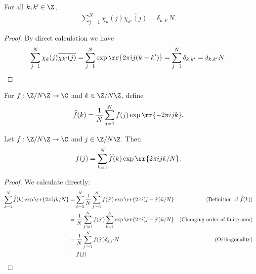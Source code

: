 \documentclass{article}
\begin{document}
\begin{claim*}[5]
  For all $k,k'\in\Z$,
  \begin{align*}
    \sum_{j=1}^N \chi_k(j)\overline{\chi_{k'}(j)} = \delta_{k,k'}N.
  \end{align*}
  \begin{proof}
    By direct calculation we have
    \begin{align*}
      \sum_{j=1}^N \chi_k(j)\overline{\chi_{k'}(j)} =
      \sum_{j=1}^N \exp\rr{2\pi ij(k-k')} =
      \sum_{j=1}^{N} \delta_{k,k'} =
      \delta_{k,k'}N.
    \end{align*}
  \end{proof}
\end{claim*}

For $f:\Z/N\Z\to\C$ and $k\in\Z/N\Z$, define
\begin{align*}
  \widehat f(k) = \frac{1}{N}\sum_{j=1}^{N} f(j)\exp\rr{-2\pi ijk}.
\end{align*}

\begin{claim*}[6a]
  Let $f:\Z/N\Z\to\C$ and $j\in\Z/N\Z$. Then
  \begin{align*}
    f(j) = \sum_{k=1}^N \widehat f(k)\exp\rr{2\pi ijk/N}.
  \end{align*}
  \begin{proof}
    We calculate directly:
    \begin{align*}
      \sum_{k=1}^N \widehat f(k)\exp\rr{2\pi ijk/N}
      &= \sum_{k=1}^N \frac{1}{N}\sum_{j'=1}^{N} f(j')\exp\rr{2\pi i(j-j')k/N}
      &\text{(Definition of $\widehat f(k)$)}\\
      &= \frac{1}{N}\sum_{j'=1}^{N}f(j')\sum_{k=1}^N\exp\rr{2\pi i(j-j')k/N}
      &\text{(Changing order of finite sum)}\\
      &= \frac{1}{N}\sum_{j'=1}^{N}f(j')\delta_{j,j'}N
      &\text{(Orthogonality)}\\
      &= f(j)
    \end{align*}
  \end{proof}
\end{claim*}
\end{document}
